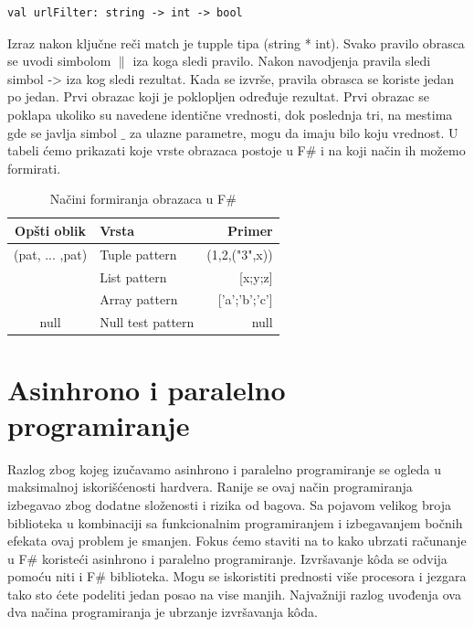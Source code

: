 \documentclass[a4paper]{article}
\begin{document}
\begin{lstlisting}
val urlFilter: string -> int -> bool
\end{lstlisting}
Izraz nakon ključne reči match je tupple tipa (string * int). Svako pravilo obrasca se uvodi simbolom $\|$ iza koga sledi pravilo. Nakon navodjenja pravila sledi simbol -> iza kog sledi rezultat. Kada se izvrše, pravila obrasca se koriste jedan po jedan. Prvi obrazac koji je poklopljen određuje rezultat. Prvi obrazac se poklapa ukoliko su navedene identične vrednosti, dok poslednja tri, na mestima gde se javlja simbol $\_$ za ulazne parametre, mogu da imaju bilo koju vrednost. U tabeli ćemo prikazati koje vrste obrazaca postoje u F\# i na koji način ih možemo formirati.
 
\begin{table}[h!]
\begin{center}
\caption{Načini formiranja obrazaca u F\#}
\begin{tabular}{|c|l|r|} \hline
\textbf{Opšti oblik}& \textbf{Vrsta}& \textbf{Primer}\\ \hline
(pat, ... ,pat) &Tuple pattern&(1,2,("3",x))
\\ \hline
[pat, ... ,pat] &List pattern&[x;y;z]\\ \hline
[$\|$pat, ... ,pat$\|$] &Array pattern&['a';'b';'c']\\ \hline
null &Null test pattern&null\\ \hline
\end{tabular}
\label{tab:tabela1}
\end{center}
\end{table}


\section{Asinhrono i paralelno programiranje}

Razlog zbog kojeg izučavamo asinhrono i paralelno programiranje se ogleda u maksimalnoj iskorišćenosti hardvera. Ranije se ovaj način programiranja izbegavao zbog dodatne složenosti i rizika od bagova. Sa pojavom velikog broja biblioteka u kombinaciji sa funkcionalnim programiranjem i izbegavanjem bočnih efekata ovaj problem je smanjen. Fokus ćemo staviti na to kako ubrzati računanje u F\# koristeći asinhrono i paralelno programiranje. Izvršavanje kôda se odvija pomoću niti i F\# biblioteka. Mogu se iskoristiti prednosti više procesora i jezgara tako sto ćete podeliti jedan posao na vise manjih. Najvažniji razlog uvođenja ova dva načina programiranja je ubrzanje izvršavanja kôda.
\end{document}

